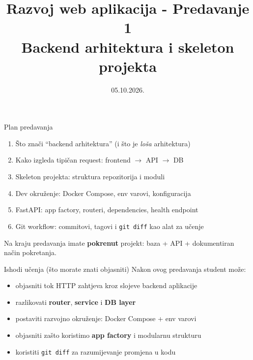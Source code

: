 

\title[Razvoj web aplikacija]{Razvoj web aplikacija - Predavanje 1 \\ Backend arhitektura i skeleton projekta}
\date{05.10.2026.}



\frame{\titlepage}

\begin{frame}{Plan predavanja}
\begin{enumerate}
  \item Što znači \enquote{backend arhitektura} (i što je \emph{loša} arhitektura)
  \item Kako izgleda tipičan request: frontend $\rightarrow$ API $\rightarrow$ DB
  \item Skeleton projekta: struktura repozitorija i moduli
  \item Dev okruženje: Docker Compose, env varovi, konfiguracija
  \item FastAPI: app factory, routeri, dependencies, health endpoint
  \item Git workflow: commitovi, tagovi i \texttt{git diff} kao alat za učenje
\end{enumerate}

\vspace{0.6em}
Na kraju predavanja imate \textbf{pokrenut} projekt: baza + API + dokumentiran način pokretanja.
\end{frame}

\begin{frame}{Ishodi učenja (što morate znati objasniti)}
Nakon ovog predavanja student može:
\begin{itemize}
  \item objasniti tok HTTP zahtjeva kroz slojeve backend aplikacije
  \item razlikovati \textbf{router}, \textbf{service} i \textbf{DB layer}
  \item postaviti razvojno okruženje: Docker Compose + env varovi
  \item objasniti zašto koristimo \textbf{app factory} i modularnu strukturu
  \item koristiti \texttt{git diff} za razumijevanje promjena u kodu
\end{itemize}
\end{frame}

